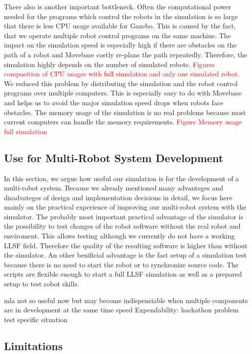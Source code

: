 There also is another important bottleneck. Often the computational power needed for the programs which control the robots in the simulation is so large that there is less CPU usage available for Gazebo. This is caused by the fact, that we operate multiple robot control programs on the same machine. The impact on the simulation speed is especially high if there are obstacles on the path of a robot and Movebase costly re-plans the path repeatedly. Therefore, the simulation highly depends on the number of simulated robots. \textcolor{red}{Figures composition of CPU usages with full simulation and only one simulated robot}. We reduced this problem by distributing the simulation and the robot control programs over multiple computers. This is especially easy to do with Movebase and helps us to avoid the major simulation speed drops when robots face obstacles.
The memory usage of the simulation is no real problems because most current computers can handle the memory requirements. \textcolor{red}{Figure Memory usage full simulation}

\subsection{Use for Multi-Robot System Development}
In this section, we argue how useful our simulation is for the development of a multi-robot system. Because we already mentioned many advanteges and disadvateges of design and implementation decisions in detail, we focus here mainly on the practical experience of improving our multi-robot system with the simulator. 
The probably most important practical advantage of the simulator is the possibility to test changes of the robot software without the real robot and enviroment. This allows testing although we currently do not have a working LLSF field. Therefore the quality of the resulting software is higher than without the simulator. An other benificial advantage is the fast setup of a simulation test because there is no need to start the robot or to synchronize source code. The scripts are flexible enough to start a full LLSF simulation as well as a prepared setup to test robot skills.


mla not so useful now but may become indispensiable when multiple components are in development at the same time
speed
Expendability: hackathon
problem test specific situation
\subsection{Limitations}

